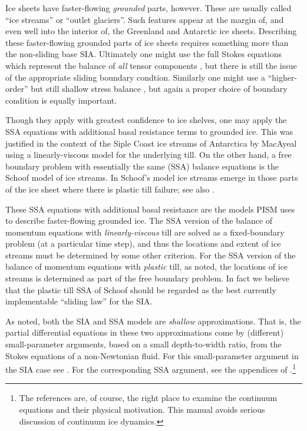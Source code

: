 \documentclass[11pt,final]{amsart}
\begin{document}
Ice sheets have faster-flowing \emph{grounded} parts, however.  These are usually called ``ice streams'' or ``outlet glaciers''.  Such features appear at the margin of, and even well into the interior of, the Greenland \cite{Joughinetal2001} and Antarctic \cite{BamberVaughanJoughin} ice sheets.  Describing these faster-flowing grounded parts of ice sheets requires something more than the non-sliding base SIA.  Ultimately one might use the full Stokes equations which represent the balance of \emph{all} tensor components \cite{Fowler}, but there is still the issue of the appropriate sliding boundary condtion.  Similarly one might use a ``higher-order'' but still shallow stress balance \cite{Blatter,Pattyn03}, but again a proper choice of boundary condition is equally important.

Though they apply with greatest confidence to ice shelves, one may apply the SSA equations with additional basal resistance terms to grounded ice.  This was justified in the context of the Siple Coast ice streams of Antarctica by MacAyeal \cite{MacAyeal,HulbeMacAyeal} using a linearly-viscous model for the underlying till.  On the other hand, a free boundary problem with essentially the same (SSA) balance equations is the Schoof \cite{SchoofStream} model of ice streams.  In Schoof's model ice streams emerge in those parts of the ice sheet where there is plastic till failure; see also \cite{SchoofTill}.

These SSA equations with additional basal resistance are the models PISM uses to describe faster-flowing grounded ice.  The SSA version of the balance of momentum equations with \emph{linearly-viscous} till are solved as a fixed-boundary problem (at a particular time step), and thus the locations and extent of ice streams must be determined by some other criterion.  For the SSA version of the balance of momentum equations with \emph{plastic} till, as noted, the locations of ice streams is determined as part of the free boundary problem.  In fact we believe that the plastic till SSA of Schoof should be regarded as the best currently implementable ``sliding law'' for the SIA.

As noted, both the SIA and SSA models are \emph{shallow} approximations.  That is, the partial differential equations in these two approximations come by (different) small-parameter arguments, based on a small depth-to-width ratio, from the Stokes equations of a non-Newtonian fluid.  For this small-parameter argument in the SIA case see \cite{Fowler}.  For the corresponding SSA argument, see the appendices of \cite{SchoofStream}.\footnote{The references are, of course, the right place to examine the continuum equations and their physical motivation.  This manual avoids serious discussion of continuum ice dynamics.}
\end{document}
